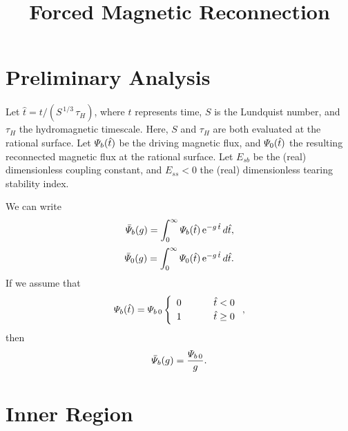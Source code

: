 \documentclass[titlepage=false,12pt]{article}
\begin{document}
\title{Forced Magnetic Reconnection}
\date{}
\maketitle

\section{Preliminary Analysis}
Let $\hat{t}= t/(S^{\,1/3}\,\tau_H)$, where $t$ represents time, $S$ is the Lundquist number, and $\tau_H$
the hydromagnetic timescale. Here, $S$ and $\tau_H$ are both evaluated at the rational surface. 
 Let ${\mit\Psi}_b(\hat{t})$ be the driving magnetic flux, and ${\mit\Psi}_0(\hat{t})$ the
resulting reconnected magnetic flux at the rational surface. Let $E_{sb}$ be the (real) dimensionless coupling constant, and $E_{ss}<0$ the  (real) dimensionless
tearing stability index.

We can write 
\begin{align}
\bar{\mit\Psi}_b(g) = \int_0^\infty {\mit\Psi}_b(\hat{t})\,{\rm e}^{-g\,\hat{t}}\,d\hat{t},\\[0.5ex]
\bar{\mit\Psi}_0(g) = \int_0^\infty {\mit\Psi}_0(\hat{t})\,{\rm e}^{-g\,\hat{t}}\,d\hat{t}.
\end{align}
If we assume that 
\begin{equation}
{\mit\Psi}_b(\hat{t}) = {\mit\Psi}_{b\,0}\left\{\begin{array}{ccc}0&~~~~&\hat{t}<0\\[0.5ex]
1&&\hat{t}\geq 0\end{array}\right.,
\end{equation}
then 
\begin{equation}\label{e4}
\bar{\mit\Psi}_b(g) = \frac{{\mit\Psi}_{b\,0}}{g}.
\end{equation}

\section{Inner Region}
\end{document}
